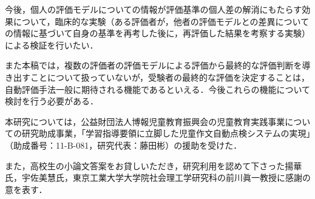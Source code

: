 \documentclass[japanese]{jnlp_1.5}
\begin{document}
今後，個人の評価モデルについての情報が評価基準の個人差の解消にもたらす効果について，臨床的な実験（ある評価者が，他者の評価モデルとの差異についての情報に基づいて自身の基準を再考した後に，再評価した結果を考察する実験）による検証を行いたい．

また本稿では，複数の評価者の評価モデルによる評価から最終的な評価判断を導き出すことについて扱っていないが，受験者の最終的な評価を決定することは，自動評価手法一般に期待される機能であるといえる．今後これらの機能について検討を行う必要がある．



\acknowledgment

本研究については，公益財団法人博報児童教育振興会の児童教育実践事業についての研究助成事業，「学習指導要領に立脚した児童作文自動点検システムの実現」（助成番号：11-B-081，研究代表：藤田彬）の援助を受けた．

また，高校生の小論文答案をお貸しいただき，研究利用を認めて下さった揚華氏，宇佐美慧氏，東京工業大学大学院社会理工学研究科の前川眞一教授に感謝の意を表す．
\end{document}
